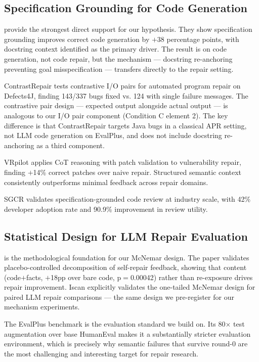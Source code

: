 \subsection{Specification Grounding for Code Generation}

\citet{Haeri2026} provide the strongest direct support for our hypothesis.
They show specification grounding improves correct code generation by $+$38 percentage
points, with docstring context identified as the primary driver. The result is on
code generation, not code repair, but the mechanism --- docstring re-anchoring preventing
goal misspecification --- transfers directly to the repair setting.

ContrastRepair \citep{Kong2024} tests contrastive I/O pairs for automated program
repair on Defects4J, finding 143/337 bugs fixed vs. 124 with single failure messages.
The contrastive pair design --- expected output alongside actual output --- is analogous
to our I/O pair component (Condition C element 2). The key difference is that
ContrastRepair targets Java bugs in a classical APR setting, not LLM code generation
on EvalPlus, and does not include docstring re-anchoring as a third component.

VRpilot \citep{Kulsum2024} applies CoT reasoning with patch validation to
vulnerability repair, finding $+$14\% correct patches over naive repair. Structured
semantic context consistently outperforms minimal feedback across repair domains.

SGCR \citep{Wang2025} validates specification-grounded code review at industry
scale, with 42\% developer adoption rate and 90.9\% improvement in review utility.

\subsection{Statistical Design for LLM Repair Evaluation}

\citet{Iscan2026} is the methodological foundation for our McNemar design. The paper
validates placebo-controlled decomposition of self-repair feedback, showing that
content (code$+$facts, $+$18pp over bare code, p$=$0.00042) rather than re-exposure drives
repair improvement. Iscan explicitly validates the one-tailed McNemar design for
paired LLM repair comparisons --- the same design we pre-register for our mechanism
experiments.

The EvalPlus benchmark \citep{Liu2023} is the evaluation standard we build on.
Its 80$\times$ test augmentation over base HumanEval makes it a substantially stricter
evaluation environment, which is precisely why semantic failures that survive round-0
are the most challenging and interesting target for repair research.

